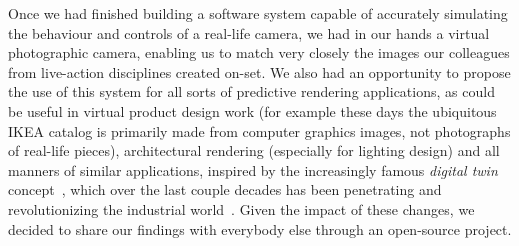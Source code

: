 Once we had finished building a software system capable of accurately simulating 
the behaviour and controls of a real-life camera, we had in our hands 
a virtual photographic camera, enabling us to match very closely the images our 
colleagues from live-action disciplines created on-set. 
We also had an opportunity to propose the use of this system for all sorts of predictive 
rendering applications, as could be useful in virtual product design work 
(for example these days the ubiquitous IKEA catalog is primarily made from computer graphics 
images, not photographs of real-life pieces),
architectural rendering (especially for lighting design) and all manners of similar applications,
inspired by the increasingly famous \emph{digital twin} concept~\cite{gelernter91},
which over the last couple decades has been penetrating and revolutionizing the
industrial world~\cite{grieves02}.
Given the impact of these changes, we decided to share our findings with everybody else through an
open-source project.



